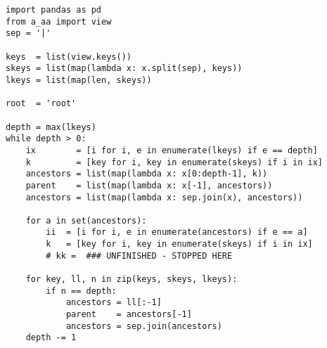 \documentclass[10pt]{amsart}
\numberwithin{equation}{section}
\begin{document}
\begin{verbatim}
import pandas as pd
from a_aa import view
sep = '|'

keys  = list(view.keys())
skeys = list(map(lambda x: x.split(sep), keys))
lkeys = list(map(len, skeys))

root  = 'root'

depth = max(lkeys)
while depth > 0:
    ix        = [i for i, e in enumerate(lkeys) if e == depth]
    k         = [key for i, key in enumerate(skeys) if i in ix]
    ancestors = list(map(lambda x: x[0:depth-1], k))
    parent    = list(map(lambda x: x[-1], ancestors))
    ancestors = list(map(lambda x: sep.join(x), ancestors))

    for a in set(ancestors):
        ii  = [i for i, e in enumerate(ancestors) if e == a]
        k   = [key for i, key in enumerate(skeys) if i in ix]
        # kk =  ### UNFINISHED - STOPPED HERE

    for key, ll, n in zip(keys, skeys, lkeys):
        if n == depth:
            ancestors = ll[:-1]
            parent    = ancestors[-1]
            ancestors = sep.join(ancestors)
    depth -= 1

\end{verbatim}
\end{document}
